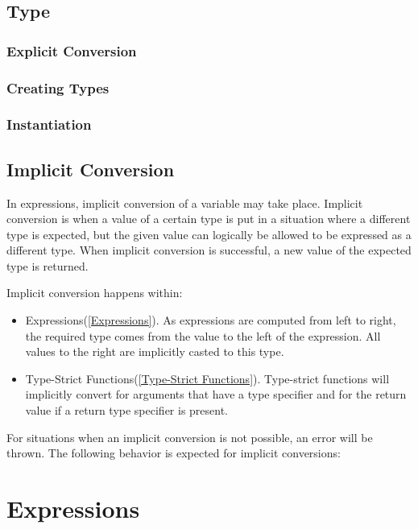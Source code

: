 \documentclass[12pt,letterpaper]{report}
\begin{document}





\section{Type}\label{Type}
\subsection{Explicit Conversion}\label{Explicit Conversion}
\subsection{Creating Types}\label{Creating Types}
\subsection{Instantiation}\label{Instantiation}
\section{Implicit Conversion}\label{Implicit Conversion}

In expressions, implicit conversion of a variable may take place. Implicit conversion is when 
a value of a certain type is put in a situation where a different type is expected, but the 
given value can logically be allowed to be expressed as a different type. When implicit 
conversion is successful, a new value of the expected type is returned.

Implicit conversion happens within:
\begin{itemize}
  \item Expressions(\autoref{Expressions}). As expressions are computed from left to right, the required type comes from the value to the left of the expression. All values to the right are implicitly casted to this type.
  \item Type-Strict Functions(\autoref{Type-Strict Functions}). Type-strict functions will implicitly convert for arguments that have a type specifier and for the return value if a return type specifier is present.
\end{itemize}

For situations when an implicit conversion is not possible, an error will be thrown.
The following behavior is expected for implicit conversions:




\chapter{Expressions}\label{Expressions}
\end{document}
